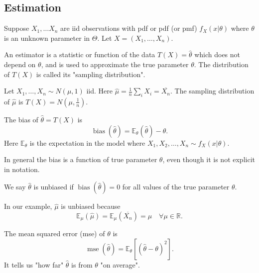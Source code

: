 \documentclass[a4paper]{scrartcl}
\begin{document}
\subsection{Estimation}
Suppose $X_1 , \ldots X_n$ are iid observations with pdf or pdf (or pmf) $f_{X}(x| \theta)$ where $\theta$ is an unknown parameter in $\Theta$. Let $X=(X_1 , \ldots , X_{n})$. 
\begin{definition*}[Estimator]
     An estimator is a statistic or function of the data $T (X)=\hat{\theta}$ which does not depend on $\theta$, and is used to approximate the true parameter $\theta$. The distribution of $T (X)$ is called its "sampling distribution". 
\end{definition*}
\begin{example*}
     Let $X_1 , \ldots ,X_{n} \sim N (\mu,1)$ iid. Here $\hat{\mu}=\frac{1}{n}\sum_{i}^{}X_{i}=\overline{X_{n}}$. The sampling distribution of $\hat{\mu} $ is $T (X)=N (\mu, \frac{1}{n})$.   
\end{example*}
\begin{definition*}[Bias]
     The bias of $\hat{\theta}=T (X)$ is \[
     \operatorname{bias}(\hat{\theta})=\mathbb{E}_{\theta} (\hat{\theta})-\theta
     .\] Here $\mathbb{E}_{\theta}$ is the expectation in the model where $X_1 , X_2 , \ldots ,X_n \sim f_{X}(x|\theta)$.
\end{definition*}
\begin{remark}
     In general the bias is a function of true parameter $\theta$, even though it is not explicit in notation.  
\end{remark}
\begin{definition*}
     We say $\hat{\theta}$ is unbiased if $\operatorname{bias}(\hat{\theta})=0$ for all values of the true parameter $\theta$. 
\end{definition*}
In our example, $\hat{\mu}$ is unbiased because \[
\mathbb{E}_{\mu}(\hat{\mu})=\mathbb{E}_{\mu}(\overline{X_{n}})=\mu \quad \forall \mu \in \mathbb{R}
.\]  
\begin{definition*}
     The mean squared error (mse) of $\theta$ is \[
     \operatorname{mse}(\hat{\theta})=\mathbb{E}_{\theta} \left[ (\hat{\theta}-\theta)^2\right]
     .\] 
     It tells us "how far" $\hat{\theta}$ is from $\theta$ "on average".
\end{definition*}
\end{document}
